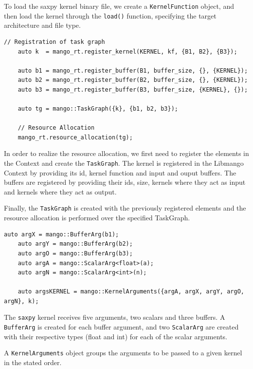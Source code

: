 To load the saxpy kernel binary file, we create a \texttt{KernelFunction} object, and then load the kernel through the \texttt{load()} function, specifying the target architecture and file type.

\begin{lstlisting}[style=CStyle, caption=Sample - TaskGraph registration and resource allocation]
    // Registration of task graph
    auto k  = mango_rt.register_kernel(KERNEL, kf, {B1, B2}, {B3});

    auto b1 = mango_rt.register_buffer(B1, buffer_size, {}, {KERNEL});
    auto b2 = mango_rt.register_buffer(B2, buffer_size, {}, {KERNEL});
    auto b3 = mango_rt.register_buffer(B3, buffer_size, {KERNEL}, {});

    auto tg = mango::TaskGraph({k}, {b1, b2, b3});

    // Resource Allocation
    mango_rt.resource_allocation(tg);
\end{lstlisting}

In order to realize the resource allocation, we first need to register the elements in the Context and create the \texttt{TaskGraph}.
The kernel is registered in the Libmango Context by providing its id, kernel function and input and ouput buffers.
The buffers are registered by providing their ids, size, kernels where they act as input and kernels where they act as output.

Finally, the \texttt{TaskGraph} is created with the previously registered elements and the resource allocation is performed over the specified TaskGraph.

\begin{lstlisting}[style=CStyle, caption=Sample - Arguments set up]
    auto argX = mango::BufferArg(b1);
    auto argY = mango::BufferArg(b2);
    auto argO = mango::BufferArg(b3);
    auto argA = mango::ScalarArg<float>(a);
    auto argN = mango::ScalarArg<int>(n);

    auto argsKERNEL = mango::KernelArguments({argA, argX, argY, argO, argN}, k);
\end{lstlisting}

The \texttt{saxpy} kernel receives five arguments, two scalars and three buffers. A \texttt{BufferArg} is created for each buffer argument, and two \texttt{ScalarArg} are created with their respective types (float and int) for each of the scalar arguments.

A \texttt{KernelArguments} object groups the arguments to be passed to a given kernel in the stated order.

